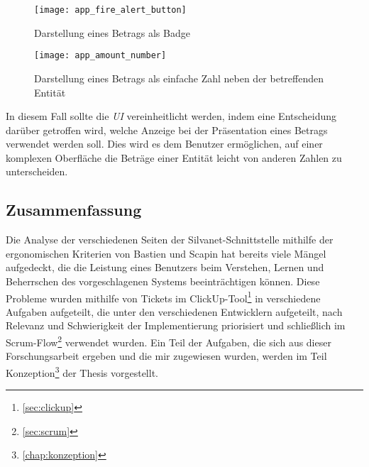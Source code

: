 \begin{figure}[H]
  \centering
  \texttt{[image: app\_fire\_alert\_button]}
  \caption{Darstellung eines Betrags als Badge}
  \label{fig:app_fire_alert_button_badge}
\end{figure}

\begin{figure}[H]
  \centering
  \texttt{[image: app\_amount\_number]}
  \caption{Darstellung eines Betrags als einfache Zahl neben der betreffenden Entität}
  \label{fig:app_amount_number}
\end{figure}

In diesem Fall sollte die \textit{UI} vereinheitlicht werden, indem eine Entscheidung darüber getroffen wird, welche Anzeige bei der Präsentation eines Betrags verwendet werden soll.
Dies wird es dem Benutzer ermöglichen, auf einer komplexen Oberfläche die Beträge einer Entität leicht von anderen Zahlen zu unterscheiden.

\subsection{Zusammenfassung}

Die Analyse der verschiedenen Seiten der Silvanet-Schnittstelle mithilfe der ergonomischen Kriterien von Bastien und Scapin hat bereits viele Mängel aufgedeckt, die die Leistung eines Benutzers beim Verstehen, Lernen und Beherrschen des vorgeschlagenen Systems beeinträchtigen können.
Diese Probleme wurden mithilfe von Tickets im ClickUp-Tool\footnote{\ref{sec:clickup}} in verschiedene Aufgaben aufgeteilt, die unter den verschiedenen Entwicklern aufgeteilt, nach Relevanz und Schwierigkeit der Implementierung priorisiert und schließlich im Scrum-Flow\footnote{\ref{sec:scrum}} verwendet wurden.
Ein Teil der Aufgaben, die sich aus dieser Forschungsarbeit ergeben und die mir zugewiesen wurden, werden im Teil Konzeption\footnote{\ref{chap:konzeption}} der Thesis vorgestellt.
